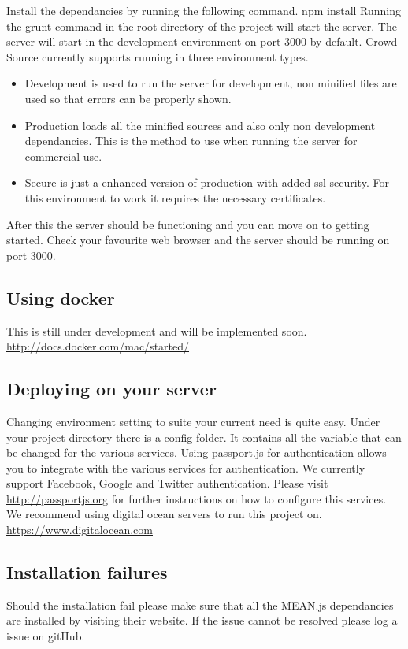 \newline
Install the dependancies by running the following command.
\newline
npm install
\newline
Running the grunt command in the root directory of the project will start the server. The server will start in the development environment on port 3000 by default. Crowd Source currently supports running in three environment types.
\begin{itemize}
	\item{Development} is used to run the server for development, non minified files are used so that errors can be properly shown.
	\item{Production} loads all the minified sources and also only non development dependancies. This is the method to use when running the server for commercial use.
	\item{Secure} is just a enhanced version of production with added ssl security. For this environment to work it requires the necessary certificates.
\end{itemize}
After this the server should be functioning and you can move on to getting started. Check your favourite web browser and the server should be running on port 3000.
\subsection{Using docker}
This is still under development and will be implemented soon.
\url{http://docs.docker.com/mac/started/}
\subsection{Deploying on your server}
Changing environment setting to suite your current need is quite easy. Under your project directory there is a config folder. It contains all the variable that can be changed for the various services. Using passport.js for authentication allows you to integrate with the various services for authentication. We currently support Facebook, Google and Twitter authentication. Please visit \url{http://passportjs.org} for further instructions on how to configure this services. We recommend using digital ocean servers to run this project on. \url{https://www.digitalocean.com}

\subsection{Installation failures}
Should the installation fail please make sure that all the MEAN.js dependancies are installed by visiting their website. If the issue cannot be resolved please log a issue on gitHub.
